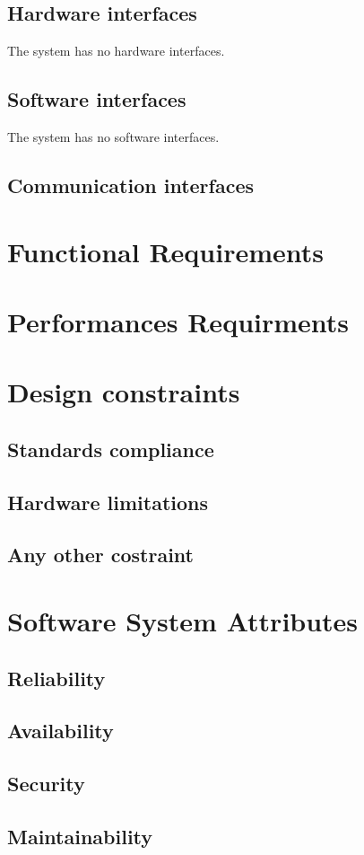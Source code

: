 \documentclass[12pt,a4paper]{report}
\begin{document}
		\subsection{Hardware interfaces}
	The system has no hardware interfaces.
		\subsection{Software interfaces}
	The system has no software interfaces.
		\subsection{Communication interfaces}
	\section{Functional Requirements}
	\section{Performances Requirments}
	\section{Design constraints}
		\subsection{Standards compliance}
		\subsection{Hardware limitations}
		\subsection{Any other costraint}
	\section{Software System Attributes}
		\subsection{Reliability}
		\subsection{Availability}
		\subsection{Security}
		\subsection{Maintainability}
\end{document}
